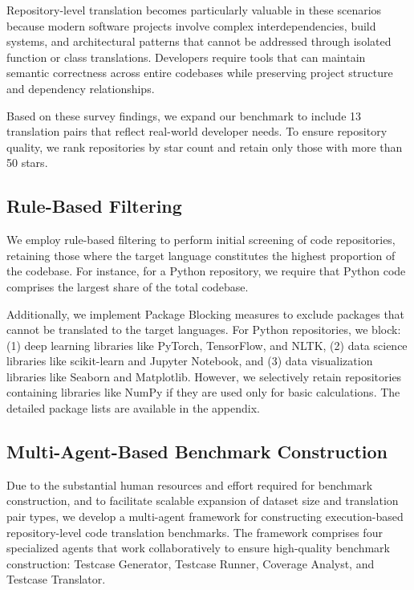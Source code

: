 Repository-level translation becomes particularly valuable in these scenarios because modern software projects involve complex interdependencies, build systems, and architectural patterns that cannot be addressed through isolated function or class translations. Developers require tools that can maintain semantic correctness across entire codebases while preserving project structure and dependency relationships.

Based on these survey findings, we expand our benchmark to include 13 translation pairs that reflect real-world developer needs. To ensure repository quality, we rank repositories by star count and retain only those with more than 50 stars.



\subsection{Rule-Based Filtering}

We employ rule-based filtering to perform initial screening of code repositories, retaining those where the target language constitutes the highest proportion of the codebase. For instance, for a Python repository, we require that Python code comprises the largest share of the total codebase.

Additionally, we implement Package Blocking measures to exclude packages that cannot be translated to the target languages. For Python repositories, we block: (1) deep learning libraries like PyTorch, TensorFlow, and NLTK, (2) data science libraries like scikit-learn and Jupyter Notebook, and (3) data visualization libraries like Seaborn and Matplotlib. However, we selectively retain repositories containing libraries like NumPy if they are used only for basic calculations. The detailed package lists are available in the appendix.


\subsection{Multi-Agent-Based Benchmark Construction}

Due to the substantial human resources and effort required for benchmark construction, and to facilitate scalable expansion of dataset size and translation pair types, we develop a multi-agent framework for constructing execution-based repository-level code translation benchmarks. The framework comprises four specialized agents that work collaboratively to ensure high-quality benchmark construction: Testcase Generator, Testcase Runner, Coverage Analyst, and Testcase Translator.

